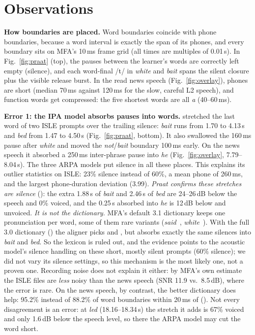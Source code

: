 \section{Observations}\label{sec:obs}
\textbf{How boundaries are placed.} Word boundaries coincide with phone boundaries, because a word interval is exactly the span of its phones, and every boundary sits on MFA's 10\,ms frame grid (all times are multiples of 0.01\,s).
In Fig.~\ref{fig:praat} (top), the pauses between the learner's words are correctly left empty (silence), and each word-final /t/ in \textit{white} and \textit{bait} spans the silent closure plus the visible release burst.
In the read news speech (Fig.~\ref{fig:overlay}), phones are short (median 70\,ms against 120\,ms for the slow, careful L2 speech), and function words get compressed: the five shortest words are all \textit{a} (40--60\,ms).

\textbf{Error 1: the IPA model absorbs pauses into words.}  stretched the last word of two ISLE prompts over the trailing silence:
\textit{bait} runs from 1.70 to 4.13\,s and \textit{bed} from 1.47 to 4.50\,s (Fig.~\ref{fig:praat}, bottom). It also swallowed the 160\,ms pause after \textit{white} and moved the \textit{not}/\textit{bait} boundary 100\,ms early.
On the news speech it absorbed a 250\,ms inter-phrase pause into \textit{he} (Fig.~\ref{fig:overlay}, 7.79--8.04\,s). The three ARPA models put silence in all these places.
This explains its outlier statistics on ISLE: 23\% silence instead of 60\%, a mean phone of 260\,ms, and the largest phone-duration deviation (3.99).
\emph{Praat confirms these stretches are silence} (): the extra 1.88\,s of \textit{bait} and 2.46\,s of \textit{bed} are 24--26\,dB below the speech and 0\% voiced, and the 0.25\,s absorbed into \textit{he} is 12\,dB below and unvoiced.
\emph{It is not the dictionary.} MFA's default  3.1 dictionary keeps one pronunciation per word, some of them rare variants (\textit{said}~, \textit{white}~).
With the full 3.0 dictionary () the aligner picks  and , but absorbs exactly the same silences into \textit{bait} and \textit{bed}. So the lexicon is ruled out, and the evidence points to the acoustic model's silence handling on these short, mostly silent prompts (60\% silence); we did not vary its silence settings, so this mechanism is the most likely one, not a proven one.
Recording noise does not explain it either: by MFA's own estimate the ISLE files are \emph{less} noisy than the news speech (SNR 11.9 vs.\ 8.5\,dB), where the error is rare.
On the news speech, by contrast, the better dictionary does help: 95.2\% instead of 88.2\% of word boundaries within 20\,ms of  ().
Not every disagreement is an  error: at \textit{led} (18.16--18.34\,s) the stretch it adds is 67\% voiced and only 1.6\,dB below the speech level, so there the ARPA model may cut the word short.

